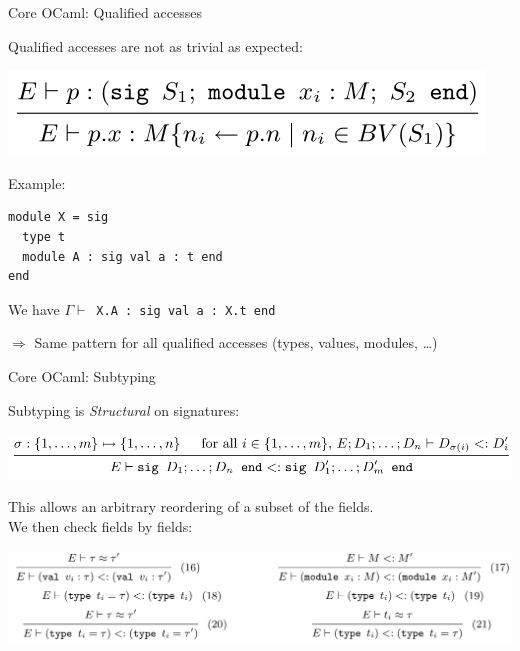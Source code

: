 \documentclass[aspectratio=169,dvipsnames,svgnames,10pt]{beamer}
\begin{document}
\begin{frame}[fragile]{Core OCaml: Qualified accesses}

  Qualified accesses are not as trivial as expected:
  \begin{center}
  \includegraphics[width=0.5\linewidth]{qualifiedaccess.png}
\end{center}

  Example:

\begin{verbatim}
module X = sig 
  type t
  module A : sig val a : t end
end
\end{verbatim}

  We have $\Gamma \vdash$~\texttt{X.A : sig val a : X.t end}

  $\Rightarrow$ Same pattern for all qualified accesses (types, values, modules, \dots)
  
\end{frame}

\begin{frame}{Core OCaml: Subtyping}

  Subtyping is \emph{Structural} on signatures:
  \begin{center}
  \includegraphics[width=0.9\linewidth]{subtypingstructure.png}
\end{center}

  This allows an arbitrary reordering of a subset of the fields.\\
  We then check fields by fields:

  \includegraphics[width=\linewidth]{subtypingfields.png}
  
\end{frame}
\end{document}

